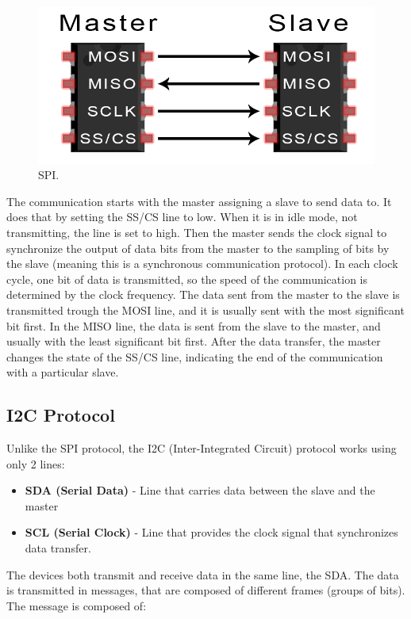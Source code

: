 \documentclass[english]{ist-thesis}
\begin{document}
\begin{figure}[ht]
	\centering
	\includegraphics[width = 0.5\linewidth]{images/protocolos/SPI_master_slave.png}
	\caption{SPI.}
	\label{fig:spi}
\end{figure}

The communication starts with the master assigning a slave to send data to. It does that by setting the SS/CS line to low. When it is  in idle mode, not transmitting, the line is set to high. Then the master sends the clock signal to synchronize the output of data bits from the master to the sampling of bits by the slave (meaning this is a synchronous communication protocol). In each clock cycle, one bit of data is transmitted, so the speed of the communication is determined by the clock frequency. The data sent from the master to the slave is transmitted trough the MOSI line, and it is usually sent with the most significant bit first. In the MISO line, the data is sent from the slave to the master, and usually with the least significant bit first. After the data transfer, the master changes the state of the SS/CS line, indicating the end of the communication with a particular slave. 

\subsection{I2C Protocol}

Unlike the SPI protocol, the I2C (Inter-Integrated Circuit) protocol works using only 2 lines:

\begin{itemize}
  \item \textbf{SDA (Serial Data)} - Line that carries data between the slave and the master
  \item \textbf{SCL (Serial Clock)} - Line that provides the clock signal that synchronizes data transfer.
\end{itemize}

The devices both transmit and receive data in the same line, the SDA. The data is transmitted in messages, that are composed of different frames (groups of bits). The message is composed of:
\end{document}
